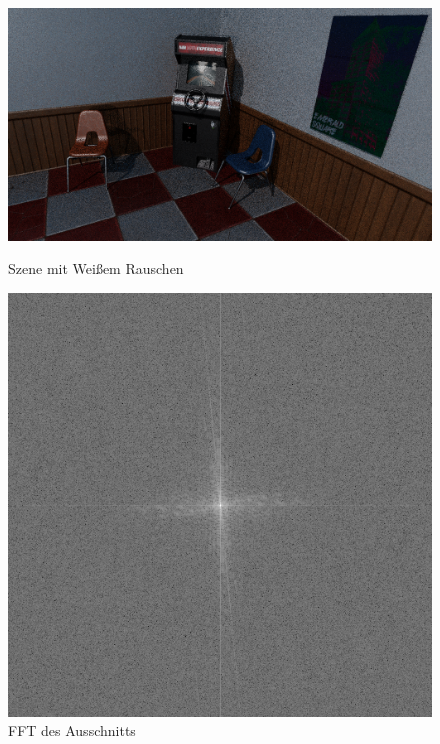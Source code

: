 \begin{figure}[H]\label{pic:WeissesRauschenTracer}
    \centering
    \begin{minipage}[t]{0.45\linewidth}
        \centering
        \includegraphics[width=\linewidth]{content/PathTracer/Bilder/WeissesRauschenSzene.png}
        \caption{Szene mit Weißem Rauschen}
    \end{minipage}
    \hfill
    \begin{minipage}[t]{0.45\linewidth}
        \centering
        \includegraphics[width=\linewidth]{content/PathTracer/Bilder/FFT_Ausschnitt2.png}
        \caption{FFT des Ausschnitts}
    \end{minipage}
\end{figure}

